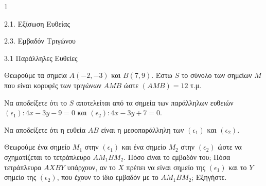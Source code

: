 \begin{ylh}{1}
    \item 2.1. Εξίσωση Ευθείας
    \item 2.3. Εμβαδόν Τριγώνου
    \item 3.1 Παράλληλες Ευθείες
\end{ylh}
Θεωρούμε τα σημεία $A(-2, -3)$ και $B(7, 9)$. Έστω $S$ το σύνολο των σημείων $M$ που είναι κορυφές των τριγώνων $AMB$ ώστε $(AMB) = 12$ τ.μ.
\begin{alist}
\item Να αποδείξετε ότι το $S$ αποτελείται από τα σημεία των παράλληλων ευθειών $(\epsilon_1): 4x - 3y - 9 = 0$ και $(\epsilon_2): 4x - 3y + 7 = 0$. 
\item Να αποδείξετε ότι η ευθεία $AB$ είναι η μεσοπαράλληλη των $(\epsilon_1)$ και $(\epsilon_2)$. 
\item Θεωρούμε ένα σημείο $M_1$ στην $(\epsilon_1)$ και ένα σημείο $M_2$ στην $(\epsilon_2)$ ώστε να σχηματίζεται το τετράπλευρο $AM_1BM_2$. Πόσο είναι το εμβαδόν του; Πόσα τετράπλευρα $AXBY$ υπάρχουν, αν το $X$ πρέπει να είναι σημείο της $(\epsilon_1)$ και το $Y$ σημείο της $(\epsilon_2)$, που έχουν το ίδιο εμβαδόν με το $AM_1BM_2$; Εξηγήστε. 
\end{alist}